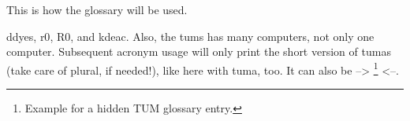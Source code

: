 This is how the glossary will be used.

\Glspl{ddye}, \gls{r0}, \gls{R0}, and \gls{kdeac}. Also, the \glspl{tum} has many \glspl{computer}, not only one \Gls{computer}. Subsequent acronym usage will only print the short version of \glspl{tuma} (take care of plural, if needed!), like here with \gls{tuma}, too. It can also be --> \footnote{Example for a hidden TUM glossary entry.} <--.




